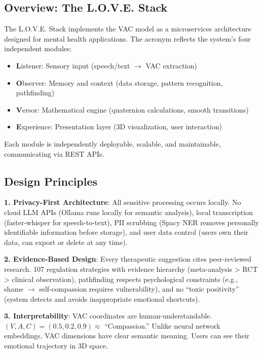 \subsection{Overview: The L.O.V.E. Stack}

The L.O.V.E. Stack implements the VAC model as a microservices architecture designed for mental health applications. The acronym reflects the system's four independent modules:

\begin{itemize}
    \item \textbf{L}istener: Sensory input (speech/text $\rightarrow$ VAC extraction)
    \item \textbf{O}bserver: Memory and context (data storage, pattern recognition, pathfinding)
    \item \textbf{V}ersor: Mathematical engine (quaternion calculations, smooth transitions)
    \item \textbf{E}xperience: Presentation layer (3D visualization, user interaction)
\end{itemize}

Each module is independently deployable, scalable, and maintainable, communicating via REST APIs.

\subsection{Design Principles}

\textbf{1. Privacy-First Architecture}: All sensitive processing occurs locally. No cloud LLM APIs (Ollama runs locally for semantic analysis), local transcription (faster-whisper for speech-to-text), PII scrubbing (Spacy NER removes personally identifiable information before storage), and user data control (users own their data, can export or delete at any time).

\textbf{2. Evidence-Based Design}: Every therapeutic suggestion cites peer-reviewed research. 107 regulation strategies with evidence hierarchy (meta-analysis > RCT > clinical observation), pathfinding respects psychological constraints (e.g., shame $\rightarrow$ self-compassion requires vulnerability), and no ``toxic positivity'' (system detects and avoids inappropriate emotional shortcuts).

\textbf{3. Interpretability}: VAC coordinates are human-understandable. $(V, A, C) = (0.5, 0.2, 0.9) \approx$ ``Compassion.'' Unlike neural network embeddings, VAC dimensions have clear semantic meaning. Users can see their emotional trajectory in 3D space.

